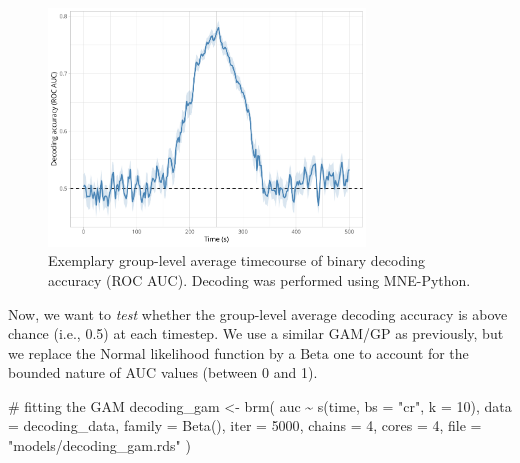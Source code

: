 \documentclass[
  doc,
  floatsintext,
  longtable,
  a4paper,
  nolmodern,
  notxfonts,
  notimes,
  colorlinks=true,linkcolor=blue,citecolor=blue,urlcolor=blue]{apa7}
\newenvironment{Shaded}{\begin{snugshade}}{\end{snugshade}}
\newcommand{\AttributeTok}[1]{\textcolor[rgb]{0.40,0.45,0.13}{#1}}
\newcommand{\CommentTok}[1]{\textcolor[rgb]{0.37,0.37,0.37}{#1}}
\newcommand{\DecValTok}[1]{\textcolor[rgb]{0.68,0.00,0.00}{#1}}
\newcommand{\FunctionTok}[1]{\textcolor[rgb]{0.28,0.35,0.67}{#1}}
\newcommand{\NormalTok}[1]{\textcolor[rgb]{0.00,0.23,0.31}{#1}}
\newcommand{\OtherTok}[1]{\textcolor[rgb]{0.00,0.23,0.31}{#1}}
\newcommand{\SpecialCharTok}[1]{\textcolor[rgb]{0.37,0.37,0.37}{#1}}
\newcommand{\StringTok}[1]{\textcolor[rgb]{0.13,0.47,0.30}{#1}}
\begin{document}
\begin{figure}[H]

\caption{Exemplary group-level average timecourse of binary decoding
accuracy (ROC AUC). Decoding was performed using MNE-Python.}

{\centering \includegraphics[width=0.75\textwidth,height=\textheight]{brms_meeg_files/figure-pdf/unnamed-chunk-2-1.pdf}

}

\end{figure}%

Now, we want to \emph{test} whether the group-level average decoding
accuracy is above chance (i.e., 0.5) at each timestep. We use a similar
GAM/GP as previously, but we replace the \(\mathrm{Normal}\) likelihood
function by a \(\mathrm{Beta}\) one to account for the bounded nature of
AUC values (between 0 and 1).

\begin{Shaded}
\begin{Highlighting}[]
\CommentTok{\# fitting the GAM}
\NormalTok{decoding\_gam }\OtherTok{\textless{}{-}} \FunctionTok{brm}\NormalTok{(}
\NormalTok{    auc }\SpecialCharTok{\textasciitilde{}} \FunctionTok{s}\NormalTok{(time, }\AttributeTok{bs =} \StringTok{"cr"}\NormalTok{, }\AttributeTok{k =} \DecValTok{10}\NormalTok{),}
    \AttributeTok{data =}\NormalTok{ decoding\_data,}
    \AttributeTok{family =} \FunctionTok{Beta}\NormalTok{(),}
    \AttributeTok{iter =} \DecValTok{5000}\NormalTok{,}
    \AttributeTok{chains =} \DecValTok{4}\NormalTok{,}
    \AttributeTok{cores =} \DecValTok{4}\NormalTok{,}
    \AttributeTok{file =} \StringTok{"models/decoding\_gam.rds"}
\NormalTok{    )}
\end{Highlighting}
\end{Shaded}
\end{document}
